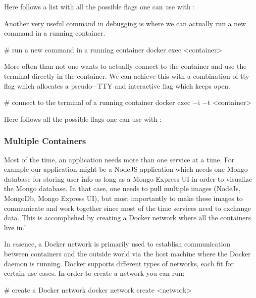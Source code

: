 Here follows a list with all the possible flags one can use with :


Another very useful command in debugging is  where we can actually run a new command in a running
container.

\begin{bash}
# run a new command in a running container
docker exec <container>
\end{bash}

More often than not one wants to actually connect to the container and use the terminal directly in the container. We
can achieve this with a combination of tty  flag which allocates a pseudo$-$TTY and interactive
 flag which keeps  open.

\begin{bash}
# connect to the terminal of a running container
docker exec $-$i $-$t <container>
\end{bash}

Here follows all the possible flags one can use with :


\subsubsection{Multiple Containers}

Most of the time, an application needs more than one service at a time. For example our application might be a NodeJS
application which needs one Mongo database for storing user info as long as a Mongo Express UI in order to visualize
the Mongo database. In that case, one needs to pull multiple images (NodeJs, MongoDb, Mongo Express UI), but most
importantly to make these images to communicate and work together since most of the time services need to exchange
data. This is accomplished by creating a Docker network where all the containers live in. \v


In essence, a Docker network is primarily used to establish communication between containers and the outside world
via the host machine where the Docker daemon is running. Docker supports different types of networks, each fit for
certain use cases. In order to create a network you can run:

\begin{bash}
# create a Docker network
docker network create <network>
\end{bash}

